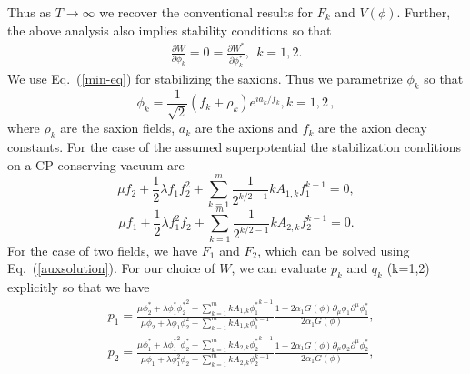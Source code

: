 \documentclass[a4paper,11pt]{article}
\begin{document}
  Thus as $T \rightarrow \infty$ we recover the conventional results for $F_k$ and $V\left(\phi\right)$. Further, the above analysis also implies stability conditions so that
  \begin{align}
    \frac{\partial W}{\partial \phi_k} = 0= \frac{\partial W^*}{\partial \phi^*_k}, ~~k=1,2.
    \label{min-eq}
  \end{align}
  We use Eq.~(\ref{min-eq}) for stabilizing the saxions. Thus we parametrize $\phi_k$ so that
  \begin{equation} \label{DisplayFormulaNumbered:eq.twoDBI.phi}
    \phi_k = \frac{1}{\sqrt 2} \left(f_k+\rho_k\right) e^{i a_k/f_k}, k=1,2\,,
  \end{equation}
  where $\rho_k$ are the saxion fields, $a_k$ are the axions and $f_k$ are the axion decay constants.
  For the case of the assumed superpotential the
  stabilization conditions on a CP conserving vacuum are
  \begin{equation} \label{DisplayFormulaNumbered:eq.twoDBI.stabilization.1}
    \mu f_2 + \frac{1}{2} \lambda f_1 f_2^2+\sum_{k=1}^m \frac{1}{2^{k/2-1}} k A_{1, k}f_1^{k-1}=0,
  \end{equation}
  \begin{equation} \label{DisplayFormulaNumbered:eq.twoDBI.stabilization.2}
    \mu f_1 + \frac{1}{2} \lambda f_1^2 f_2+\sum_{k=1}^m \frac{1}{2^{k/2-1}} k A_{2, k}f_2^{k-1}=0.
  \end{equation}
  For the case of two fields, we have $F_1$ and $F_2$, which can be solved using Eq.~(\ref{auxsolution}).
  For our choice of $W$, we can evaluate $p_k$ and $q_k$ (k=1,2) explicitly so that we have
  \begin{equation} \label{DisplayFormulaNumbered:eq.twoDBI.p.1}
  \begin{split}
    & p_1
    =\frac{\mu \phi^*_2+\lambda \phi^*_1{\phi^*_2}^2+\sum_{k=1}^mk A_{1, k}{\phi^*_1}^{k-1}}{\mu \phi_2+\lambda \phi_1\phi_2^2+\sum_{k=1}^mk A_{1, k}\phi_1^{k-1}}\frac{1-2\alpha_1G\left(\phi\right)\partial_\mu \phi_1\partial^\mu \phi^*_1}{2\alpha_1G\left(\phi\right)},
  \end{split}
  \end{equation}
  \begin{equation} \label{DisplayFormulaNumbered:eq.twoDBI.p.2}
  \begin{split}
    & p_2
    =\frac{\mu \phi^*_1+\lambda {\phi^*_1}^2 \phi^*_2 + \sum_{k=1}^mk A_{2, k}{\phi^*_2}^{k-1}}{\mu \phi_1+\lambda \phi_1^2\phi_2+\sum_{k=1}^mk A_{2, k}\phi_2^{k-1}}\frac{1-2\alpha_1G\left(\phi\right)\partial_\mu \phi_2\partial^\mu \phi^*_2}{2\alpha_1G\left(\phi\right)},
  \end{split}
  \end{equation}
\end{document}
